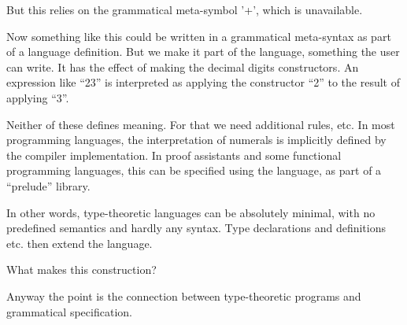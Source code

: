 But this relies on the grammatical meta-symbol '+', which is
unavailable.

Now something like this could be written in a grammatical meta-syntax
as part of a language definition.  But we make it part of the
language, something the user can write.  It has the effect of making
the decimal digits constructors.  An expression like ``23'' is
interpreted as applying the constructor ``2'' to the result of
applying ``3''.

Neither of these defines meaning.  For that we need additional rules,
etc.  In most programming languages, the interpretation of numerals is
implicitly defined by the compiler implementation.  In proof
assistants and some functional programming languages, this can be
specified using the language, as part of a ``prelude'' library.

In other words, type-theoretic languages can be absolutely minimal,
with no predefined semantics and hardly any syntax.  Type declarations
and definitions etc. then extend the language.

\begin{ednote}
  What makes this construction?
\end{ednote}

\begin{ednote}
  Anyway the point is the connection between type-theoretic programs
  and grammatical specification.
\end{ednote}

